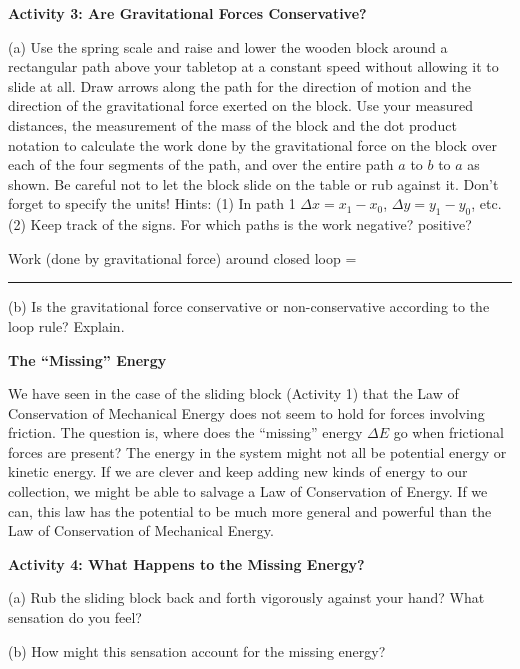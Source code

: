 \textbf{Activity 3: Are Gravitational Forces Conservative? }

(a) Use the spring scale and raise and lower the wooden block around a rectangular
path above your tabletop at a constant speed without allowing it to slide at
all. Draw arrows along the path for the direction of motion and the direction
of the gravitational force exerted on the block. Use your measured distances,
the measurement of the mass of the block and the dot product notation to calculate the work done by the gravitational force on the block over each of the four segments of the path, and over the entire path $a$ to $b$ to $a$ as shown. Be careful not to let the block slide on the table or rub against it. Don't forget to specify the units! Hints: (1) In path 1 
\( \Delta  x
= x_{1}  - x_{0} \), \( \Delta  y = y_{1}  - y_{0} \),
etc. (2) Keep track of the signs. For which paths is the work negative? positive?
\vspace{40mm}

   Work (done by gravitational force) around closed loop = \rule{1.5in}{0.1pt}

\vspace{5mm}

(b) Is the gravitational force conservative or non-conservative according to
the loop rule? Explain.
\vspace{20mm}

\textbf{The ``Missing'' Energy} 

We have seen in the case of the sliding block (Activity 1) that the Law of Conservation of Mechanical Energy does not seem to hold for forces involving friction. The question is, where does the ``missing'' energy \( \Delta  \)$E$ go when
frictional forces are present? The energy in the system might not all be potential energy or kinetic energy. If we are clever and keep adding new kinds of energy to our collection, we might be able to salvage a Law of Conservation of Energy. If we can, this law has the potential to be much more general and powerful than the Law of Conservation of Mechanical Energy.

\textbf{Activity 4: What Happens to the Missing Energy?} 

(a) Rub the sliding block back and forth vigorously against your hand? What
sensation do you feel?
\vspace{10mm}

(b) How might this sensation account for the missing energy?
\vspace{20mm}


